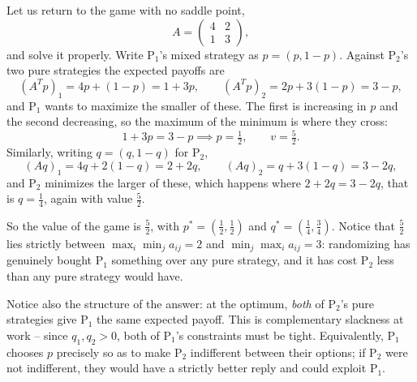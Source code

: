 \begin{example}
    Let us return to the game with no saddle point,
    $$
    A = \begin{pmatrix} 4 & 2\\1&3\end{pmatrix},
    $$
    and solve it properly. Write $\mathrm{P}_1$'s mixed strategy as $p = (p, 1-p)$. Against $\mathrm{P}_2$'s two pure strategies the expected payoffs are
    $$
    (A^Tp)_1 = 4p + (1-p) = 1 + 3p, \qquad (A^Tp)_2 = 2p + 3(1-p) = 3 - p,
    $$
    and $\mathrm{P}_1$ wants to maximize the smaller of these. The first is increasing in $p$ and the second decreasing, so the maximum of the minimum is where they cross:
    $$
    1 + 3p = 3 - p \implies p = \tfrac12, \qquad v = \tfrac52.
    $$
    Similarly, writing $q = (q, 1-q)$ for $\mathrm{P}_2$,
    $$
    (Aq)_1 = 4q + 2(1-q) = 2 + 2q, \qquad (Aq)_2 = q + 3(1-q) = 3 - 2q,
    $$
    and $\mathrm{P}_2$ minimizes the larger of these, which happens where $2 + 2q = 3 - 2q$, that is $q = \frac14$, again with value $\frac52$.

    So the value of the game is $\frac52$, with $p^* = \left(\frac12,\frac12\right)$ and $q^* = \left(\frac14,\frac34\right)$. Notice that $\frac52$ lies strictly between $\max_i\min_j a_{ij} = 2$ and $\min_j\max_i a_{ij} = 3$: randomizing has genuinely bought $\mathrm{P}_1$ something over any pure strategy, and it has cost $\mathrm{P}_2$ less than any pure strategy would have.

    Notice also the structure of the answer: at the optimum, \emph{both} of $\mathrm{P}_2$'s pure strategies give $\mathrm{P}_1$ the same expected payoff. This is complementary slackness at work -- since $q_1, q_2 > 0$, both of $\mathrm{P}_1$'s constraints must be tight. Equivalently, $\mathrm{P}_1$ chooses $p$ precisely so as to make $\mathrm{P}_2$ indifferent between their options; if $\mathrm{P}_2$ were not indifferent, they would have a strictly better reply and could exploit $\mathrm{P}_1$.
\end{example}


